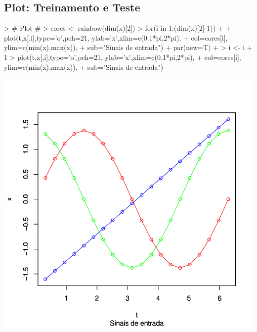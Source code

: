 \documentclass{article}
\begin{document}
\subsection{Plot: Treinamento e Teste}
\begin{Schunk}
\begin{Sinput}
> # Plot #
> cores <- rainbow(dim(x)[2])
> for(i in 1:(dim(x)[2]-1))
+ {
+   plot(t,x[,i],type='o',pch=21, ylab='x',xlim=c(0.1*pi,2*pi),
+        col=cores[i],  ylim=c(min(x),max(x)),
+        sub="Sinais de entrada")
+   par(new=T)
+ }
> i <- i + 1
> plot(t,x[,i],type='o',pch=21, ylab='x',xlim=c(0.1*pi,2*pi),
+        col=cores[i],  ylim=c(min(x),max(x)),
+        sub="Sinais de entrada")
\end{Sinput}
\end{Schunk}
\includegraphics{adaline-008}
\end{document}
